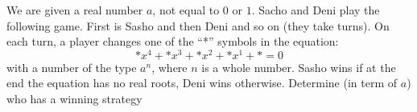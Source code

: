 We are given a real number $a$, not equal to $0$ or $1$. Sacho and Deni play the following game. First is Sasho and then Deni and so on (they take turns). On each turn, a player changes one of the “*” symbols in the equation:
\[*x^4+*x^3+*x^2+*x^1+*=0\]
with a number of the type $a^n$, where $n$ is a whole number. Sasho wins if at the end the equation has no real roots, Deni wins otherwise. Determine (in term of $a$) who has a winning strategy
